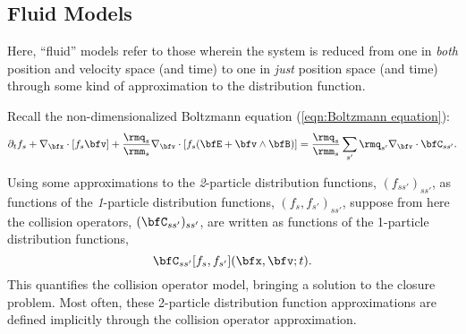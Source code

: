 \subsection{Fluid Models}\label{cha:fluid models}
    \line

    \begin{definition}\label{def:fluid model}
        Here, ``fluid'' models refer to those wherein the system is reduced from one in \emph{both} position and velocity space (and time) to one in \emph{just} position space (and time) through some kind of approximation to the distribution function.
    \end{definition}

    \line
    
    Recall the non-dimensionalized Boltzmann equation (\ref{eqn:Boltzmann equation}):
    \begin{equation*}
        \partial_{t}f_{s} + \nabla_{\bfx}\cdot[f_{s}\bfv] + \frac{\rmq_{s}}{\rmm_{s}}\nabla_{\bfv}\cdot[f_{s}(\bfE + \bfv\wedge\bfB)]  =  \frac{\rmq_{s}}{\rmm_{s}}\sum_{s'}\rmq_{s'}\nabla_{\bfv}\cdot\bfC_{ss'}.
    \end{equation*}
    
    Using some approximations to the \emph{2}-particle distribution functions, $(f_{ss'})_{ss'}$, as functions of the \emph{1}-particle distribution functions, $(f_{s}, f_{s'})_{ss'}$, suppose from here the collision operators, $(\bfC_{ss'})_{ss'}$, are written as functions of the 1-particle distribution functions,
    \begin{equation}
        \bfC_{ss'}[f_{s}, f_{s'}](\bfx, \bfv; t).
    \end{equation}
    This quantifies the collision operator model, bringing a solution to the closure problem. Most often, these 2-particle distribution function approximations are defined implicitly through the collision operator approximation.


    
    
    
    
    